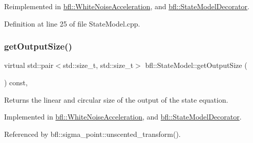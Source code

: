 Reimplemented in \mbox{\hyperlink{classbfl_1_1WhiteNoiseAcceleration_a819bd0d5510c9863272b422ab33b7adc}{bfl\+::\+White\+Noise\+Acceleration}}, and \mbox{\hyperlink{classbfl_1_1StateModelDecorator_a6825b807be82c66feb8bbb62d240490b}{bfl\+::\+State\+Model\+Decorator}}.



Definition at line 25 of file State\+Model.\+cpp.

\mbox{\label{classbfl_1_1StateModel_a6bf680b689389d959fc9ac46595e6dab}} 
\subsubsection{\texorpdfstring{get\+Output\+Size()}{getOutputSize()}}
{\footnotesize\ttfamily virtual std\+::pair$<$std\+::size\+\_\+t, std\+::size\+\_\+t$>$ bfl\+::\+State\+Model\+::get\+Output\+Size (\begin{DoxyParamCaption}{ }\end{DoxyParamCaption}) const\hspace{0.3cm}{\ttfamily [pure virtual]}, {\ttfamily [inherited]}}



Returns the linear and circular size of the output of the state equation. 



Implemented in \mbox{\hyperlink{classbfl_1_1WhiteNoiseAcceleration_ac3e447bf2f520b543c67d066f72423b7}{bfl\+::\+White\+Noise\+Acceleration}}, and \mbox{\hyperlink{classbfl_1_1StateModelDecorator_a2b2f00e6825e382587a2edbbba4569de}{bfl\+::\+State\+Model\+Decorator}}.



Referenced by bfl\+::sigma\+\_\+point\+::unscented\+\_\+transform().

\mbox{\label{classbfl_1_1StateModel_acb582cb7d41ec7b854ed1dbd8965b6fc}} 
